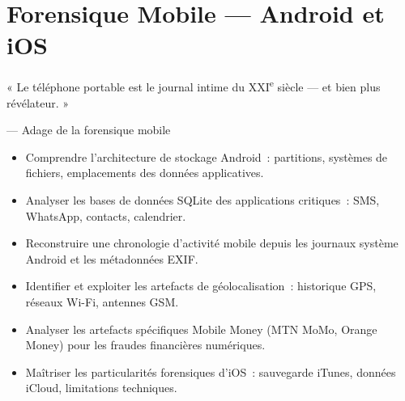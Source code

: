 
\chapter{Forensique Mobile --- Android et iOS}
\label{chap:for-mob}

\epigraph{%
    « Le téléphone portable est le journal intime du XXI\textsuperscript{e}
    siècle --- et bien plus révélateur. »%
}{--- Adage de la forensique mobile}


\begin{boxobjectifs}
\begin{itemize}
    \item Comprendre l'architecture de stockage Android~: partitions,
          systèmes de fichiers, emplacements des données applicatives.
    \item Analyser les bases de données SQLite des applications
          critiques~: SMS, WhatsApp, contacts, calendrier.
    \item Reconstruire une chronologie d'activité mobile depuis
          les journaux système Android et les métadonnées EXIF.
    \item Identifier et exploiter les artefacts de géolocalisation~:
          historique GPS, réseaux Wi-Fi, antennes GSM.
    \item Analyser les artefacts spécifiques Mobile Money (MTN MoMo,
          Orange Money) pour les fraudes financières numériques.
    \item Maîtriser les particularités forensiques d'iOS~: sauvegarde
          iTunes, données iCloud, limitations techniques.
\end{itemize}
\end{boxobjectifs}

